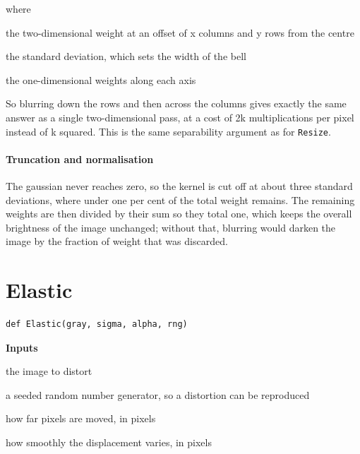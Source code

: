 \noindent where
\begin{description}[leftmargin=2.4em,style=nextline,font=\normalfont\ttfamily]\setlength\itemsep{1pt}
  \item[{$G(x,y)$}] \normalfont the two-dimensional weight at an offset of x columns and y rows from the centre
  \item[{$\sigma$}] \normalfont the standard deviation, which sets the width of the bell
  \item[{$G(x),\, G(y)$}] \normalfont the one-dimensional weights along each axis
\end{description}
So blurring down the rows and then across the columns gives exactly the same answer as a single two-dimensional pass, at a cost of 2k multiplications per pixel instead of k squared. This is the same separability argument as for \texttt{Resize}.


\paragraph{Truncation and normalisation}
The gaussian never reaches zero, so the kernel is cut off at about three standard deviations, where under one per cent of the total weight remains. The remaining weights are then divided by their sum so they total one, which keeps the overall brightness of the image unchanged; without that, blurring would darken the image by the fraction of weight that was discarded.


\section{Elastic}
\begin{lstlisting}[style=sig]
def Elastic(gray, sigma, alpha, rng)
\end{lstlisting}

\noindent\textbf{Inputs}
\begin{description}[leftmargin=2.2em,style=nextline,font=\normalfont\ttfamily]\setlength\itemsep{1pt}
  \item[{img}] \normalfont the image to distort
  \item[{rng}] \normalfont a seeded random number generator, so a distortion can be reproduced
  \item[{alpha}] \normalfont how far pixels are moved, in pixels
  \item[{sigma}] \normalfont how smoothly the displacement varies, in pixels
\end{description}

